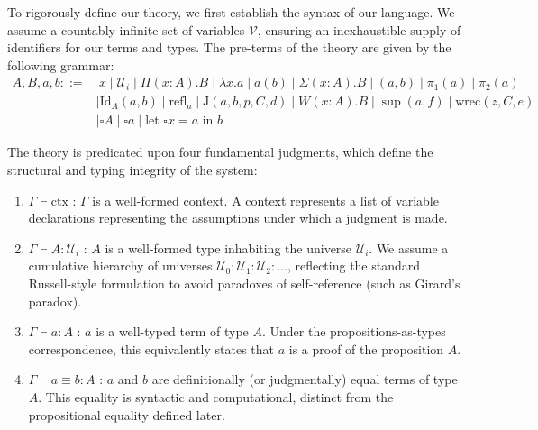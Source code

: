 To rigorously define our theory, we first establish the syntax of our language. We assume a countably infinite set of variables $\mathcal{V}$, ensuring an inexhaustible supply of identifiers for our terms and types. The pre-terms of the theory are given by the following grammar:
\begin{align*}
A, B, a, b ::= & \ x \mid \mathcal{U}_i \mid \Pi(x:A).B \mid \lambda x.a \mid a(b) \mid \Sigma(x:A).B \mid (a, b) \mid \pi_1(a) \mid \pi_2(a) \\
& \mid \mathrm{Id}_A(a, b) \mid \mathrm{refl}_a \mid \mathrm{J}(a, b, p, C, d) \mid W(x:A).B \mid \sup(a, f) \mid \mathrm{wrec}(z, C, e) \\
& \mid \square A \mid \square a \mid \text{let } \square x = a \text{ in } b
\end{align*}

The theory is predicated upon four fundamental judgments, which define the structural and typing integrity of the system:
\begin{enumerate}
    \item $\Gamma \vdash \text{ctx}$ : $\Gamma$ is a well-formed context. A context represents a list of variable declarations representing the assumptions under which a judgment is made.
    \item $\Gamma \vdash A : \mathcal{U}_i$ : $A$ is a well-formed type inhabiting the universe $\mathcal{U}_i$. We assume a cumulative hierarchy of universes $\mathcal{U}_0 : \mathcal{U}_1 : \mathcal{U}_2 : \dots$, reflecting the standard Russell-style formulation to avoid paradoxes of self-reference (such as Girard's paradox).
    \item $\Gamma \vdash a : A$ : $a$ is a well-typed term of type $A$. Under the propositions-as-types correspondence, this equivalently states that $a$ is a proof of the proposition $A$.
    \item $\Gamma \vdash a \equiv b : A$ : $a$ and $b$ are definitionally (or judgmentally) equal terms of type $A$. This equality is syntactic and computational, distinct from the propositional equality defined later.
\end{enumerate}


